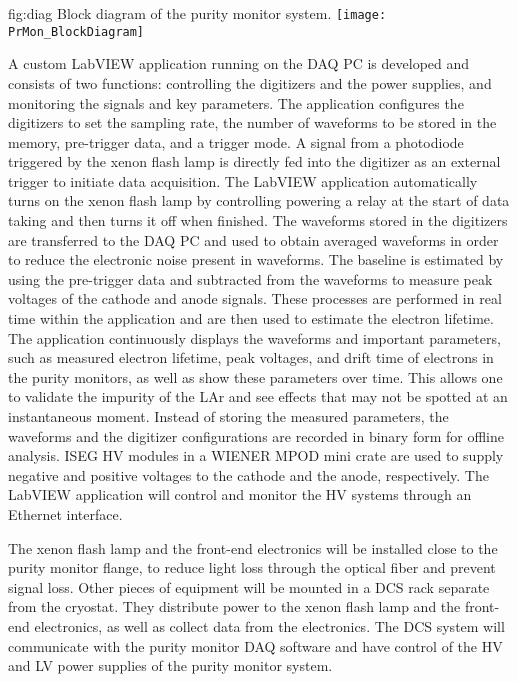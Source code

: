 \begin{dunefigure}{fig:diag}
  {Block diagram of the purity monitor system.}
  \texttt{[image: PrMon\_BlockDiagram]}%
\end{dunefigure}

A custom LabVIEW application running on the DAQ PC is developed and consists of two functions: controlling the digitizers and the power supplies, and monitoring the signals and key parameters. The application configures the digitizers to set the sampling rate, the number of waveforms to be stored in the memory, pre-trigger data, and a trigger mode. A signal from a photodiode triggered by the xenon flash lamp is directly fed into the digitizer as an external trigger to initiate data acquisition. The LabVIEW application automatically turns on the xenon flash lamp by controlling powering a relay at the start of data taking and then turns it off when finished. The waveforms stored in the digitizers are transferred to the DAQ PC and used to obtain averaged waveforms in order to reduce the electronic noise present in waveforms. The baseline is estimated by using the pre-trigger data and subtracted from the waveforms to measure peak voltages of the cathode and anode signals. These processes are performed in real time within the application and are then used to estimate the electron lifetime. The application continuously displays the waveforms and important parameters, such as measured electron lifetime, peak voltages, and drift time of electrons in the purity monitors, as well as show these parameters over time. This allows one to validate the impurity of the LAr and see effects that may not be spotted at an instantaneous moment. Instead of storing the measured parameters, the waveforms and the digitizer configurations are recorded in binary form for offline analysis. ISEG HV modules in a WIENER MPOD mini crate are used to supply negative and positive voltages to the cathode and the anode, respectively. The LabVIEW application will control and monitor the HV systems through an Ethernet interface.  

The xenon flash lamp and the front-end electronics will be installed close to the purity monitor flange, to reduce light loss through the optical fiber and prevent signal loss. Other pieces of equipment will be mounted in a DCS rack separate from the cryostat. They distribute power to the xenon flash lamp and the front-end electronics, as well as collect data from the electronics. The DCS system will communicate with the purity monitor DAQ software and have control of the HV and LV power supplies of the purity monitor system. 

